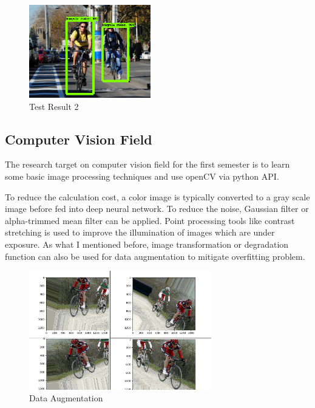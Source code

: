 \documentclass[titlepage]{article}
\begin{document}
\newpage
\begin{figure}[htbp]
\centering
\includegraphics[width=200]{test2.png}
\caption{Test Result 2}
\end{figure}

\subsection{Computer Vision Field}
\label{sec:org56be481}
The research target on computer vision field for the first semester is to
learn some basic image processing techniques and use openCV via python
API. 

To reduce the calculation cost, a color image is typically converted to
a gray scale image before fed into deep neural network. To reduce the noise,
Gaussian filter or alpha-trimmed mean filter can be applied. Point processing
tools like contrast stretching is used to improve the illumination of images
which are under exposure. As what I mentioned before, image transformation or
degradation function can also be used for data augmentation to mitigate
overfitting problem. 

\begin{figure}[htbp]
\centering
\includegraphics[width=300]{data_aug.png}
\caption{Data Augmentation}
\end{figure}
\end{document}
